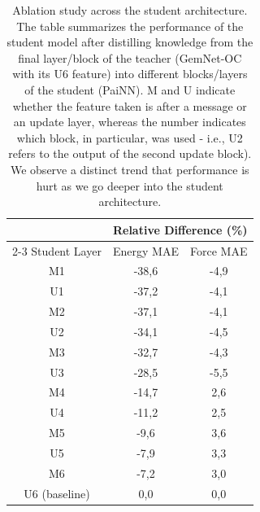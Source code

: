 \documentclass{article}
\begin{document}
\begin{table}[h]
\caption{Ablation study across the student architecture. The table summarizes the performance of the student model after distilling knowledge from the final layer/block of the teacher (GemNet-OC with its U6 feature) into different blocks/layers of the student (PaiNN). M and U indicate whether the feature taken is after a message or an update layer, whereas the number indicates which block, in particular, was used - i.e., U2 refers to the output of the second update block). We observe a distinct trend that performance is hurt as we go deeper into the student architecture.}
\label{tab:ablation1}
\centering
\begin{tabular}{ccc}
                                   & \multicolumn{2}{c}{Relative Difference (\%)} \\ \cline{2-3} 
Student Layer                              & Energy MAE            & Force MAE            \\ \hline
\multicolumn{1}{c|}{M1}            & -38,6                 & -4,9                 \\
\multicolumn{1}{c|}{U1}            & -37,2                 & -4,1                 \\
\multicolumn{1}{c|}{M2}            & -37,1                 & -4,1                 \\
\multicolumn{1}{c|}{U2}            & -34,1                 & -4,5                 \\
\multicolumn{1}{c|}{M3}            & -32,7                 & -4,3                 \\
\multicolumn{1}{c|}{U3}            & -28,5                 & -5,5                 \\
\multicolumn{1}{c|}{M4}            & -14,7                 & 2,6                  \\
\multicolumn{1}{c|}{U4}            & -11,2                 & 2,5                  \\
\multicolumn{1}{c|}{M5}            & -9,6                  & 3,6                  \\
\multicolumn{1}{c|}{U5}            & -7,9                  & 3,3                  \\
\multicolumn{1}{c|}{M6}            & -7,2                  & 3,0                  \\
\multicolumn{1}{c|}{U6 (baseline)} & 0,0                   & 0,0                 
\end{tabular}
\end{table}
\end{document}
